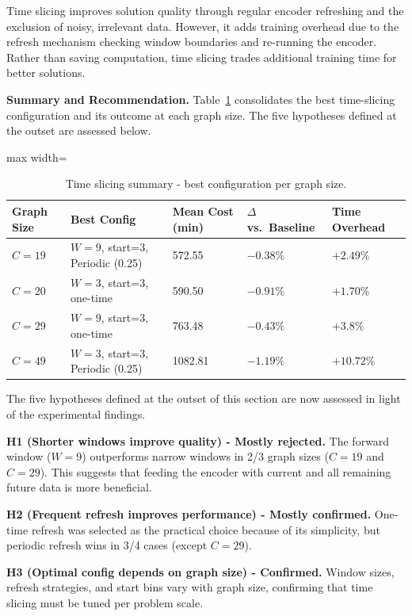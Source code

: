 Time slicing improves solution quality through regular encoder refreshing and the exclusion
of noisy, irrelevant data. However, it adds training overhead due to the refresh mechanism
checking window boundaries and re-running the encoder. Rather than saving computation, time
slicing trades additional training time for better solutions.

\textbf{Summary and Recommendation.} Table~\ref{tab:time_slicing_summary} consolidates the best time-slicing configuration and
its outcome at each graph size. The five hypotheses defined at the outset are assessed below.

\begin{table}[H]
\centering
\caption{Time slicing summary - best configuration per graph size.}
\label{tab:time_slicing_summary}
\begin{adjustbox}{max width=\textwidth}
\begin{tabular}{lllll}
\toprule
\textbf{Graph Size} & \textbf{Best Config} & \textbf{Mean Cost (min)}
    & \textbf{$\Delta$ vs.\ Baseline} & \textbf{Time Overhead} \\
\midrule
$C = 19$ & $W=9$, start=3, Periodic (0.25) & 572.55  & $-0.38\%$ & $+2.49\%$ \\
$C = 20$ & $W=3$, start=3, one-time        & 590.50  & $-0.91\%$ & $+1.70\%$ \\
$C = 29$ & $W=9$, start=3, one-time        & 763.48  & $-0.43\%$ & $+3.8\%$ \\
$C = 49$ & $W=3$, start=3, Periodic (0.25) & 1082.81 & $-1.19\%$ & $+10.72\%$ \\
\bottomrule
\end{tabular}
\end{adjustbox}
\end{table}

The five hypotheses defined at the outset of this section are now assessed in light of the
experimental findings.

\textbf{H1 (Shorter windows improve quality) - Mostly rejected.} The forward window
($W = 9$) outperforms narrow windows in 2/3 graph sizes ($C = 19$ and $C = 29$). This
suggests that feeding the encoder with current and all remaining future data is more
beneficial.

\textbf{H2 (Frequent refresh improves performance) - Mostly confirmed.} One-time refresh
was selected as the practical choice because of its simplicity, but periodic refresh wins
in 3/4 cases (except $C = 29$).

\textbf{H3 (Optimal config depends on graph size) - Confirmed.} Window sizes, refresh
strategies, and start bins vary with graph size, confirming that time slicing must be tuned
per problem scale.


